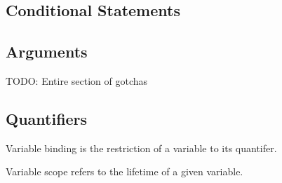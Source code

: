 \documentclass{article}
\theoremstyle{definition}
\begin{document}




\subsection{Conditional Statements}



\subsection{Arguments}



TODO: Entire section of gotchas

\subsection{Quantifiers}



Variable binding is the restriction of a variable to its quantifer.

Variable scope refers to the lifetime of a given variable.



    
\end{document}
